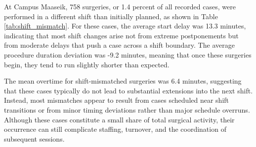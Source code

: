 \documentclass[
]{article}
\begin{document}
At Campus Maaseik, 758 surgeries, or 1.4 percent of all recorded cases,
were performed in a different shift than initially planned, as shown in
Table \ref{tab:shift_mismatch}. For these cases, the average start delay
was 13.3 minutes, indicating that most shift changes arise not from
extreme postponements but from moderate delays that push a case across a
shift boundary. The average procedure duration deviation was -9.2
minutes, meaning that once these surgeries begin, they tend to run
slightly shorter than expected.

The mean overtime for shift-mismatched surgeries was 6.4 minutes,
suggesting that these cases typically do not lead to substantial
extensions into the next shift. Instead, most mismatches appear to
result from cases scheduled near shift transitions or from minor timing
deviations rather than major schedule overruns. Although these cases
constitute a small share of total surgical activity, their occurrence
can still complicate staffing, turnover, and the coordination of
subsequent sessions.
\end{document}
